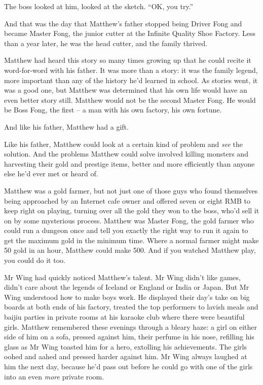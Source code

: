 The boss looked at him, looked at the sketch. ``OK, you try.''

And that was the day that Matthew's father stopped being Driver
Fong and became Master Fong, the junior cutter at the Infinite
Quality Shoe Factory. Less than a year later, he was the head
cutter, and the family thrived.

Matthew had heard this story so many times growing up that he could
recite it word-for-word with his father. It was more than a story:
it was the family legend, more important than any of the history
he'd learned in school. As stories went, it was a good one, but
Matthew was determined that his own life would have an even better
story still. Matthew would not be the second Master Fong. He would
be Boss Fong, the first -- a man with his own factory, his own
fortune.

And like his father, Matthew had a gift.

Like his father, Matthew could look at a certain kind of problem
and \emph{see} the solution. And the problems Matthew could solve
involved killing monsters and harvesting their gold and prestige
items, better and more efficiently than anyone else he'd ever met
or heard of.

Matthew was a gold farmer, but not just one of those guys who found
themselves being approached by an Internet cafe owner and offered
seven or eight RMB to keep right on playing, turning over all the
gold they won to the boss, who'd sell it on by some mysterious
process. Matthew was Master Fong, the gold farmer who could run a
dungeon once and tell you exactly the right way to run it again to
get the maximum gold in the minimum time. Where a normal farmer
might make 50 gold in an hour, Matthew could make 500. And if you
watched Matthew play, you could do it too.

Mr Wing had quickly noticed Matthew's talent. Mr Wing didn't like
games, didn't care about the legends of Iceland or England or India
or Japan. But Mr Wing understood how to make boys work. He
displayed their day's take on big boards at both ends of his
factory, treated the top performers to lavish meals and baijiu
parties in private rooms at his karaoke club where there were
beautiful girls. Matthew remembered these evenings through a bleary
haze: a girl on either side of him on a sofa, pressed against him,
their perfume in his nose, refilling his glass as Mr Wing toasted
him for a hero, extolling his achievements. The girls oohed and
aahed and pressed harder against him. Mr Wing always laughed at him
the next day, because he'd pass out before he could go with one of
the girls into an even \emph{more} private room.

